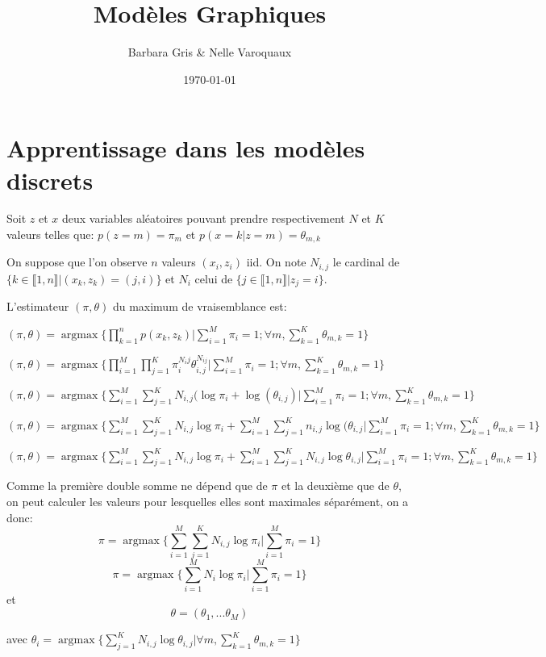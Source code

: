 \documentclass{article}
\date{\today}
\title{Modèles Graphiques}
\author{Barbara Gris \& Nelle Varoquaux}
\DeclareMathOperator{\argmax}{argmax}
\begin{document}
\maketitle
\tableofcontents{}
\vfill \eject


\section{Apprentissage dans les modèles discrets}
Soit $z$ et $x$ deux variables aléatoires pouvant prendre
respectivement $N$ et $K$ valeurs telles que: $p(z= m) =
\pi_m$ et $p(x=k|z=m) = \theta_{m,k}$

On suppose que l'on observe $n$ valeurs $(x_i, z_i)$ iid. On note 
$N_{i, j}$ le cardinal de 
$\{k \in \llbracket 1, n \rrbracket | (x_{k}, z_k) = (j, i)\}$ et $N_i$ celui
de $\{j \in \llbracket 1, n \rrbracket | z_j = i \}$.

L'estimateur $(\pi, \theta)$ du maximum de vraisemblance est:

$(\pi, \theta) = \argmax \{ \prod_{k=1}^n p(x_k, z_k) | \sum_{i=1}^{M}\pi_{i}=1; \forall m,\sum_{k=1}^{K}\theta_{m,k}=1 \}$

$(\pi, \theta) = \argmax \{ \prod_{i=1}^M \prod_{j=1}^K \pi_i^{N_ij} \theta_{i,j}^{N_{ij}} | \sum_{i=1}^{M}\pi_{i}=1; \forall m,\sum_{k=1}^{K}\theta_{m,k}=1 \}$

$(\pi, \theta) = \argmax \{\sum_{i=1}^{M} \sum_{j=1}^K N_{i,j}(\log\pi_{i} + \log(\theta_{i,j})| \sum_{i=1}^{M}\pi_{i}=1; \forall m,\sum_{k=1}^{K}\theta_{m,k}=1 \}$

$(\pi, \theta) = \argmax \{\sum_{i=1}^{M} \sum_{j=1}^K N_{i,j}\log\pi_{i} + \sum_{i=1}^{M} \sum_{j=1}^K n_{i,j}\log(\theta_{i,j}| \sum_{i=1}^{M}\pi_{i}=1; \forall m,\sum_{k=1}^{K}\theta_{m,k}=1 \}$

$(\pi, \theta) = \argmax \{\sum_{i=1}^{M} \sum_{j=1}^K N_{i,j}\log\pi_{i} + \sum_{i=1}^{M} \sum_{j=1}^K N_{i,j}\log\theta_{i,j} | \sum_{i=1}^{M}\pi_{i}=1; \forall m,\sum_{k=1}^{K}\theta_{m,k}=1 \}$

Comme la première double somme ne dépend que de $\pi$ et la deuxième que de $\theta$, on peut calculer les valeurs pour lesquelles elles sont maximales séparément, on a donc:
$$\pi = \argmax \{\sum_{i=1}^{M} \sum_{j=1}^K N_{i,j} \log\pi_i| \sum_{i=1}^{M}\pi_{i}=1 \}$$
$$\pi=\argmax \{\sum_{i=1}^{M}  N_{i} \log\pi_i| \sum_{i=1}^{M}\pi_{i}=1 \}$$
et
$$\theta = (\theta_1, ... \theta_M)$$

avec $\theta_i = \argmax \{ \sum_{j=1}^K N_{i,j}\log\theta_{i,j}|\forall m,\sum_{k=1}^{K}\theta_{m,k}=1 \}$
\end{document}
